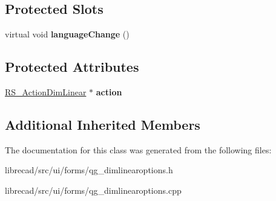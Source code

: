 \subsection*{Protected Slots}
\begin{DoxyCompactItemize}
\item 
\hypertarget{classQG__DimLinearOptions_a76675e5f8285232e78f9b3738cbb5cce}{virtual void {\bfseries language\-Change} ()}\label{classQG__DimLinearOptions_a76675e5f8285232e78f9b3738cbb5cce}

\end{DoxyCompactItemize}
\subsection*{Protected Attributes}
\begin{DoxyCompactItemize}
\item 
\hypertarget{classQG__DimLinearOptions_ad1a25e3690c35143ad64ddb30b05012e}{\hyperlink{classRS__ActionDimLinear}{R\-S\-\_\-\-Action\-Dim\-Linear} $\ast$ {\bfseries action}}\label{classQG__DimLinearOptions_ad1a25e3690c35143ad64ddb30b05012e}

\end{DoxyCompactItemize}
\subsection*{Additional Inherited Members}


The documentation for this class was generated from the following files\-:\begin{DoxyCompactItemize}
\item 
librecad/src/ui/forms/qg\-\_\-dimlinearoptions.\-h\item 
librecad/src/ui/forms/qg\-\_\-dimlinearoptions.\-cpp\end{DoxyCompactItemize}
